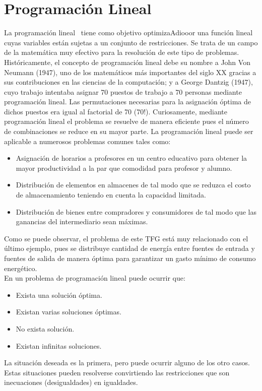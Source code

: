 \section{Programación Lineal}
La programación lineal~\cite{Loom64} tiene como objetivo optimizaAdiooor una función lineal cuyas variables están sujetas a un conjunto de restricciones.
Se trata de un campo de la matemática muy efectivo para la resolución de este tipo de problemas. Históricamente, el concepto de programación lineal debe su nombre a John Von Neumann (1947), uno de los matemáticos más importantes del siglo XX gracias a sus contribuciones en las ciencias de la computación; y a George Dantzig (1947), cuyo trabajo intentaba asignar 70 puestos de trabajo a 70 personas mediante programación lineal. Las permutaciones necesarias para la asignación óptima de dichos puestos era igual al factorial de 70 (70!). Curiosamente, mediante programación lineal el problema se resuelve de manera eficiente pues el número de combinaciones se reduce en su mayor parte. La programación lineal puede ser aplicable a numerosos problemas comunes tales como:
\begin{itemize}
\item Asignación de horarios a profesores en un centro educativo para obtener la mayor productividad a la par que comodidad para profesor y alumno.
\item Distribución de elementos en almacenes de tal modo que se reduzca el costo de almacenamiento teniendo en cuenta la capacidad limitada.
\item Distribución de bienes entre compradores y consumidores de tal modo que las ganancias del intermediario sean máximas.
\end{itemize}
Como se puede observar, el problema de este \gls{TFG} está muy relacionado con el último ejemplo, pues se distribuye cantidad de energía entre fuentes de entrada y fuentes de salida de manera óptima para garantizar un gasto mínimo de consumo energético.\\

En un problema de programación lineal puede ocurrir que:
\begin{itemize}
\item Exista una solución óptima.
\item Existan varias soluciones óptimas.
\item No exista solución.
\item Existan infinitas soluciones.
\end{itemize}
La situación deseada es la primera, pero puede ocurrir alguno de los otro casos. Estas situaciones pueden resolverse convirtiendo las restricciones que son inecuaciones (desigualdades) en igualdades.\\

